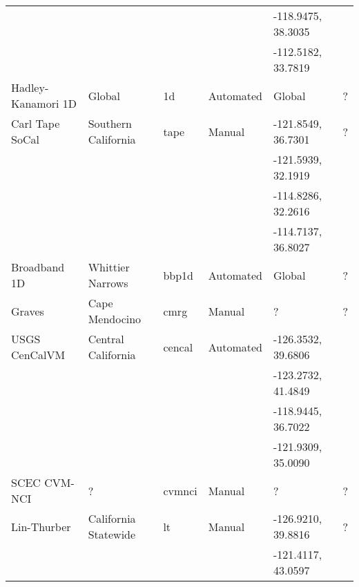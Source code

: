 \begin{table*}[ht!]
\begin{tabular}[]{lllllp{1.25in}}
                   &                       &               &              & -118.9475, 38.3035 &                              \\
                   &                       &               &              & -112.5182, 33.7819 &                              \\
Hadley-Kanamori 1D & Global                & 1d            &  Automated   & Global             & ?                            \\
Carl Tape SoCal    & Southern California   & tape          &  Manual      & -121.8549, 36.7301 & ?	                          \\
                   &                       &               &              & -121.5939, 32.1919 &                              \\
                   &                       &               &              & -114.8286, 32.2616 &                              \\
                   &                       &               &              & -114.7137, 36.8027 &                              \\
Broadband 1D       & Whittier Narrows      & bbp1d         &  Automated   & Global             & ?                            \\
Graves             & Cape Mendocino        & cmrg          &  Manual      & ?                  & ?                            \\
USGS CenCalVM      & Central California    & cencal        &  Automated   & -126.3532, 39.6806 & \citet{Brocher_2005_Tech}    \\
                   &                       &               &              & -123.2732, 41.4849 & \citet{Brocher_2006_Proc}    \\
                   &                       &               &              & -118.9445, 36.7022 &                              \\
                   &                       &               &              & -121.9309, 35.0090 &                              \\
SCEC CVM-NCI       & ?                     & cvmnci        &  Manual      & ?                  & ?                            \\
Lin-Thurber        & California Statewide  & lt            &  Manual      & -126.9210, 39.8816 & ?                            \\
                   &                       &               &              & -121.4117, 43.0597 &                              \\

\end{tabular}
\end{table*}
